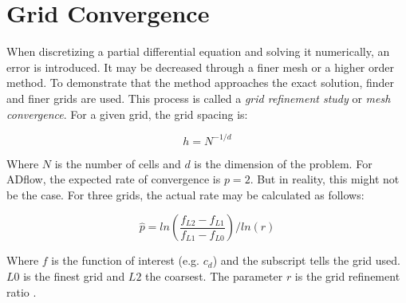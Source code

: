 \section{Grid Convergence}
When discretizing a partial differential equation and solving it numerically,
an error is introduced. It may be decreased through a finer mesh or a higher
order method. To demonstrate that the method approaches the exact solution,
finder and finer grids are used. This process is called a \textit{grid
refinement study} or \textit{mesh convergence}. For a given grid, the grid
spacing is:

\begin{equation}
  h = N^{-1/d}
\end{equation}

\noindent Where $N$ is the number of cells and $d$ is the dimension of the
problem.
For ADflow, the expected rate of convergence is $p=2$. But in reality, this
might not be the case. For three grids, the actual rate may be calculated as
follows:

\begin{equation}
  \hat p = ln(\frac{f_{L2} - f_{L1}}{f_{L1} - f_{L0}}) / ln(r)
  \label{eq:conv_rate}
\end{equation}

\noindent Where $f$ is the function of interest (e.g. $c_{d}$) and the subscript
tells the grid used. $L0$ is the finest grid and $L2$ the coarsest. The
parameter $r$ is the grid refinement ratio .\cite{grid_refinement}
